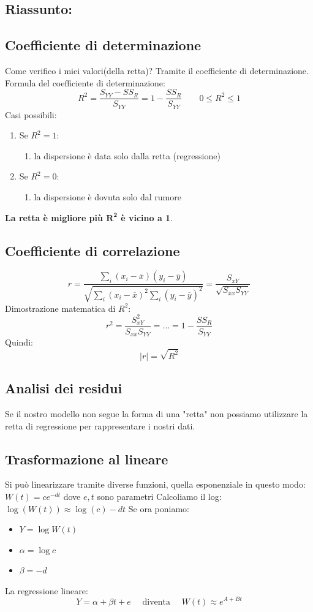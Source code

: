 \documentclass[]{article}
\begin{document}
    \subsection{Riassunto:}\label{sec:riassunto}
    \subsection{Coefficiente di determinazione}\label{sec:coefficiente-di-determinazione}
    Come verifico i miei valori(della retta)? Tramite il coefficiente di determinazione.
    Formula del coefficiente di determinazione:
    \[ R^2 = \frac{S_{YY}-SS_R}{S_{YY}} = 1- \frac{SS_R}{S_{YY}} \quad  \quad 0 \leq R^2 \leq 1 \]
    Casi possibili:
    \begin{enumerate}
        \item Se $R^2 = 1$:
        \begin{enumerate}
            \item la dispersione è data solo dalla retta (regressione)
        \end{enumerate}
        \item Se $R^2 = 0$:
        \begin{enumerate}
            \item la dispersione è dovuta solo dal rumore
        \end{enumerate}
    \end{enumerate}
    
    \textbf{La retta è migliore più $\boldsymbol{R^2}$ è vicino a 1}.
    \subsection{Coefficiente di correlazione}\label{sec:coefficiente-di-correlazione}
    \[ r = \frac{\sum_i (x_i - \overline x)(y_i - \overline y)}{\sqrt{\sum_i (x_i - \overline x)^2 \sum_i(y_i - \overline y)^2}} = \frac{S_{xY}}{\sqrt{S_{xx}S_{YY}}} \]
    Dimostrazione matematica di $R^2$:
    \[ r^2 = \frac{S_{xY}^2}{S_{xx}S_{YY}} = \ldots = 1- \frac{SS_R}{S_{YY}} \]
    Quindi:
    \[ |r| = \sqrt{R^2} \]
    \subsection{Analisi dei residui}\label{sec:analisi-dei-residui}
    Se il nostro modello non segue la forma di una "retta" non possiamo utilizzare la retta di regressione per rappresentare i nostri dati.
    \subsection{Trasformazione al lineare}\label{sec:trasformazione-al-lineare}
    Si può linearizzare tramite diverse funzioni, quella esponenziale in questo modo:
    $W(t) = ce^{-dt}$ dove $e, t$ sono parametri
    Calcoliamo il log:
    $\log({W}(t)) \approx \log{(c)}-dt$
    Se ora poniamo:
    \begin{itemize}
        \item $Y = \log{W(t)}$
        \item $\alpha = \log{c}$
        \item $\beta = -d$
    \end{itemize}
    La regressione lineare:
    \[ Y = \alpha + \beta t + e \quad \text{ diventa } \quad W(t) \approx e^{A+Bt} \]
\end{document}
